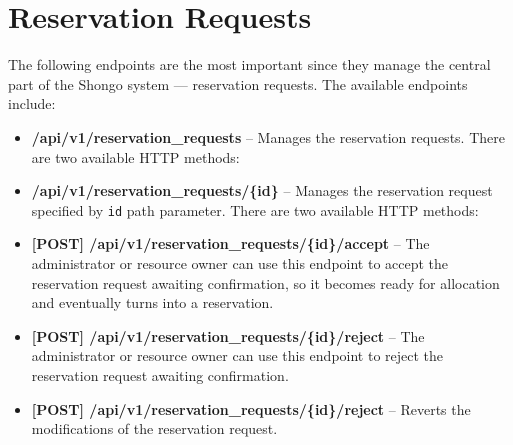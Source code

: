 \section{Reservation Requests}
The following endpoints are the most important since they manage the central part of the Shongo system --- reservation requests.
The available endpoints include:
\begin{itemize}
    \item \textbf{/api/v1/reservation\_requests} -- Manages the reservation requests. There are two available HTTP methods:
    \item \textbf{/api/v1/reservation\_requests/\{id\}} -- Manages the reservation request specified by \texttt{id} path parameter. There are two available HTTP methods:
    \item \textbf{[POST] /api/v1/reservation\_requests/\{id\}/accept} -- The administrator or resource owner can use this endpoint to accept the reservation request awaiting confirmation, so it becomes ready for allocation and eventually turns into a reservation.
    \item \textbf{[POST] /api/v1/reservation\_requests/\{id\}/reject} -- The administrator or resource owner can use this endpoint to reject the reservation request awaiting confirmation.
    \item \textbf{[POST] /api/v1/reservation\_requests/\{id\}/reject} -- Reverts the modifications of the reservation request.
\end{itemize}


